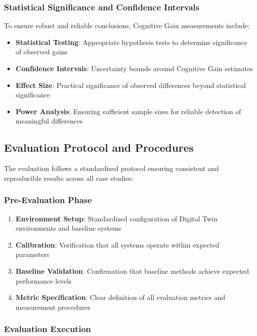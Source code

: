 \subsubsection{Statistical Significance and Confidence Intervals}

To ensure robust and reliable conclusions, Cognitive Gain measurements include:

\begin{itemize}
\item \textbf{Statistical Testing}: Appropriate hypothesis tests to determine significance of observed gains
\item \textbf{Confidence Intervals}: Uncertainty bounds around Cognitive Gain estimates
\item \textbf{Effect Size}: Practical significance of observed differences beyond statistical significance
\item \textbf{Power Analysis}: Ensuring sufficient sample sizes for reliable detection of meaningful differences
\end{itemize}

\subsection{Evaluation Protocol and Procedures}

The evaluation follows a standardized protocol ensuring consistent and reproducible results across all case studies:

\subsubsection{Pre-Evaluation Phase}

\begin{enumerate}
\item \textbf{Environment Setup}: Standardized configuration of Digital Twin environments and baseline systems
\item \textbf{Calibration}: Verification that all systems operate within expected parameters
\item \textbf{Baseline Validation}: Confirmation that baseline methods achieve expected performance levels
\item \textbf{Metric Specification}: Clear definition of all evaluation metrics and measurement procedures
\end{enumerate}

\subsubsection{Evaluation Execution}

